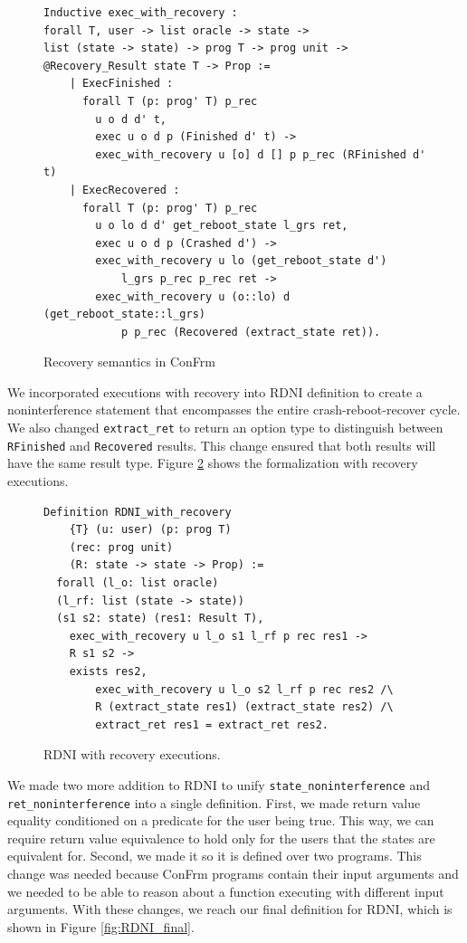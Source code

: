 \begin{figure}[ht]
    \centering
    \begin{verbatim}
Inductive exec_with_recovery :
forall T, user -> list oracle -> state -> 
list (state -> state) -> prog T -> prog unit -> 
@Recovery_Result state T -> Prop :=
    | ExecFinished :
      forall T (p: prog' T) p_rec
        u o d d' t,
        exec u o d p (Finished d' t) ->
        exec_with_recovery u [o] d [] p p_rec (RFinished d' t)
    | ExecRecovered :
      forall T (p: prog' T) p_rec
        u o lo d d' get_reboot_state l_grs ret,
        exec u o d p (Crashed d') ->
        exec_with_recovery u lo (get_reboot_state d') 
            l_grs p_rec p_rec ret ->
        exec_with_recovery u (o::lo) d (get_reboot_state::l_grs) 
            p p_rec (Recovered (extract_state ret)).
    \end{verbatim}
    \caption{Recovery semantics in ConFrm}
    \label{fig:Recovery_Semantics}
\end{figure}

We incorporated executions with recovery into RDNI definition to create a noninterference statement that encompasses the entire crash-reboot-recover cycle. We also changed \texttt{extract\_ret} to return an option type to distinguish between \texttt{RFinished} and \texttt{Recovered} results. This change ensured that both results will have the same result type. Figure \ref{fig:RDNI_recovery} shows the formalization with recovery executions.

\begin{figure}[ht]
    \centering
    \begin{verbatim}
Definition RDNI_with_recovery
    {T} (u: user) (p: prog T) 
    (rec: prog unit)
    (R: state -> state -> Prop) :=
  forall (l_o: list oracle) 
  (l_rf: list (state -> state))
  (s1 s2: state) (res1: Result T),
    exec_with_recovery u l_o s1 l_rf p rec res1 ->
    R s1 s2 ->
    exists res2,
        exec_with_recovery u l_o s2 l_rf p rec res2 /\
        R (extract_state res1) (extract_state res2) /\
        extract_ret res1 = extract_ret res2.
    \end{verbatim}
    \caption{RDNI with recovery executions.}
    \label{fig:RDNI_recovery}
\end{figure}

We made two more addition to RDNI to unify \texttt{state\_noninterference} and \texttt{ret\_noninterference} into a single definition. First, we made return value equality conditioned on a predicate for the user being true. This way, we can require return value equivalence to hold only for the users that the states are equivalent for. Second, we made it so it is defined over two programs. This change was needed because ConFrm programs contain their input arguments and we needed to be able to reason about a function executing with different input arguments. With these changes, we reach our final definition for RDNI, which is shown in Figure \ref{fig:RDNI_final}.

